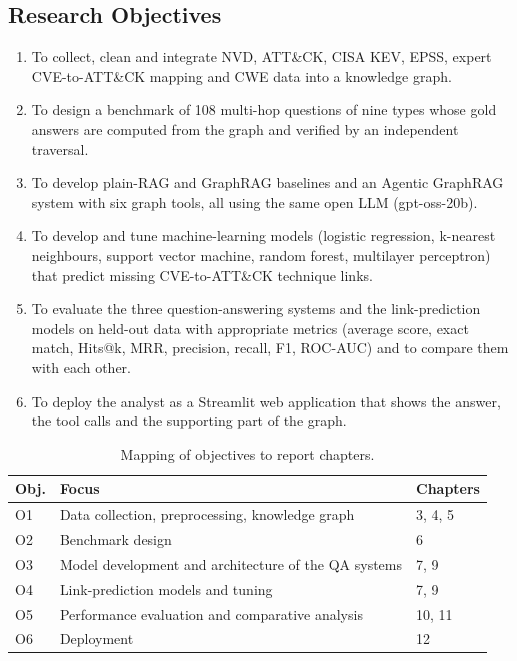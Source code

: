 \documentclass[12pt, a4paper]{article}
\newif\iffull      \fullfalse        %
\newcommand{\ATTCK}{ATT\&CK}
\begin{document}
\subsection{Research Objectives}\label{sec:objectives}
\begin{enumerate}[noitemsep, topsep=3pt, label=\textbf{O\arabic*.}]
    \item To collect, clean and integrate NVD, \ATTCK{}, CISA KEV, EPSS, expert CVE-to-\ATTCK{} mapping and CWE data into a knowledge graph.
    \item To design a benchmark of 108 multi-hop questions of nine types whose gold answers are computed from the graph and verified by an independent traversal.
    \item To develop plain-RAG and GraphRAG baselines and an Agentic GraphRAG system with six graph tools, all using the same open LLM (gpt-oss-20b).
    \item To develop and tune machine-learning models (logistic regression, k-nearest neighbours, support vector machine, random forest, multilayer perceptron) that predict missing CVE-to-\ATTCK{} technique links\iffull, and to compare them with a graph neural network\fi.
    \item To evaluate the three question-answering systems and the link-prediction models on held-out data with appropriate metrics (average score, exact match, Hits@k, MRR, precision, recall, F1, ROC-AUC) and to compare them with each other.
    \item To deploy the analyst as a Streamlit web application that shows the answer, the tool calls and the supporting part of the graph.
\end{enumerate}
\begin{table}[H]\centering\caption{Mapping of objectives to report chapters.}\label{tab:objmap}
\begin{tabular}{p{1.2cm}p{7.2cm}p{5cm}}\toprule
\textbf{Obj.} & \textbf{Focus} & \textbf{Chapters} \\ \midrule
O1 & Data collection, preprocessing, knowledge graph & 3, 4, 5 \\
O2 & Benchmark design & 6 \\
O3 & Model development and architecture of the QA systems & 7, 9 \\
O4 & Link-prediction models and tuning & 7, 9 \\
O5 & Performance evaluation and comparative analysis & 10, 11 \\
O6 & Deployment & 12 \\ \bottomrule
\end{tabular}
\end{table}
\end{document}

